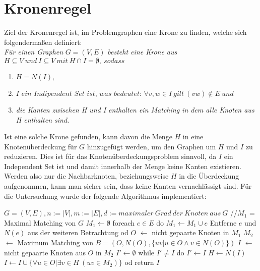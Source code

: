 \section{Kronenregel}
\label{ch:Grundlagen:sec:Kronenregel}
Ziel der Kronenregel ist, im Problemgraphen eine Krone zu finden, welche sich folgendermaßen definiert:\\
\textit{Für einen Graphen} $G=(V,E)$ \textit{besteht eine Krone aus} $H \subseteq V\ und\ I \subseteq V\ mit\ H \cap I = \emptyset,\ sodass$ 
\begin{enumerate}
\item $H = N(I),$ 
\item $\textit{I ein Indipendent Set ist, was bedeutet: }\forall v, w \in I\ gilt\ (vw) \notin E\ und$
\item \textit{die Kanten zwischen H und I enthalten ein Matching in dem alle Knoten aus H enthalten sind.}
\end{enumerate}
Ist eine solche Krone gefunden, kann davon die Menge $H$ in eine Knotenüberdeckung für $G$ hinzugefügt werden, um den Graphen um $H$ und $I$ zu reduzieren. Dies ist für das Knotenüberdeckungsproblem sinnvoll, da $I$ ein Independent Set ist und damit innerhalb der Menge keine Kanten existieren. Werden also nur die Nachbarknoten, beziehungsweise $H$ in die Überdeckung aufgenommen, kann man sicher sein, dass keine Kanten vernachlässigt sind. Für die Untersuchung wurde der folgende Algorithmus implementiert:
\begin{singlespace}
\begin{algorithm}[caption={Kronenregel.}, label={alg2}]
$G = (V, E), n:= |V|, m:=|E|, d:= maximaler\ Grad\ der\ Knoten\ aus\ G$
//$M_{1}$ = Maximal Matching von $G$
$M_{1} \leftarrow \emptyset$
foreach $e \in E$ do
  $M_{1} \leftarrow M_{1} \cup e$
  Entferne $e$ und $N(e)$ aus der weiteren Betrachtung
od
$O$ $\leftarrow$ nicht gepaarte Knoten in $M_{1}$
$M_{2}$ $\leftarrow$ Maximum Matching von $B = (O, N(O), \{ uv| u \in O \wedge v \in N(O)\}) $
$I$ $\leftarrow$ nicht gepaarte Knoten aus $O$ in $M_{2}$
$I'  \leftarrow \emptyset$
while $I' \neq I$ do
  $I' \leftarrow I$
  $H \leftarrow N(I)$
  $I \leftarrow I \cup \{\forall u \in O|\exists v\in H\ (uv \in M_{2})\}$
od
return $I$
\end{algorithm}
\end{singlespace}
